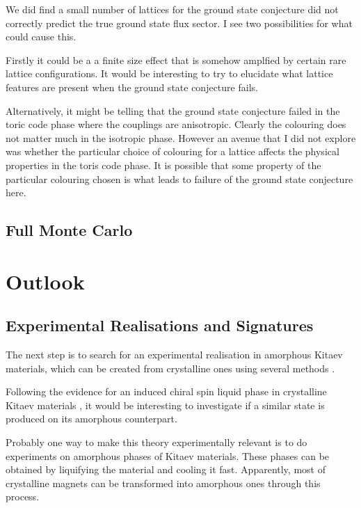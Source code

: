 We did find a small number of lattices for the ground state conjecture
did not correctly predict the true ground state flux sector. I see two
possibilities for what could cause this.

Firstly it could be a a finite size effect that is somehow amplfied by
certain rare lattice configurations. It would be interesting to try to
elucidate what lattice features are present when the ground state
conjecture fails.

Alternatively, it might be telling that the ground state conjecture
failed in the toric code phase where the couplings are anisotropic.
Clearly the colouring does not matter much in the isotropic phase.
However an avenue that I did not explore was whether the particular
choice of colouring for a lattice affects the physical properties in the
toris code phase. It is possible that some property of the particular
colouring chosen is what leads to failure of the ground state conjecture
here.

\hypertarget{full-monte-carlo}{%
\subsection{Full Monte Carlo}\label{full-monte-carlo}}

\hypertarget{outlook}{%
\section{Outlook}\label{outlook}}

\hypertarget{experimental-realisations-and-signatures}{%
\subsection{Experimental Realisations and
Signatures}\label{experimental-realisations-and-signatures}}

The next step is to search for an experimental realisation in amorphous
Kitaev materials, which can be created from crystalline ones using
several methods \autocite{Weaire1976,Petrakovski1981,Kaneyoshi2018}.

Following the evidence for an induced chiral spin liquid phase in
crystalline Kitaev materials
\autocite{Kasahara2018,Yokoi2021,Yamashita2020,Bruin2022}, it would be
interesting to investigate if a similar state is produced on its
amorphous counterpart.

Probably one way to make this theory experimentally relevant is to do
experiments on amorphous phases of Kitaev materials. These phases can be
obtained by liquifying the material and cooling it fast. Apparently,
most of crystalline magnets can be transformed into amorphous ones
through this process.

